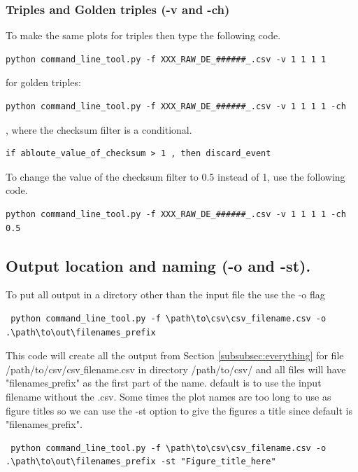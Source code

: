 \documentclass[12pt]{article}
\begin{document}
\subsubsection{Triples and Golden triples (-v and -ch)} 

To make the same plots for triples then type the following code.

\begin{verbatim}
python command_line_tool.py -f XXX_RAW_DE_######_.csv -v 1 1 1 1

\end{verbatim}

for golden triples:

\begin{verbatim}
python command_line_tool.py -f XXX_RAW_DE_######_.csv -v 1 1 1 1 -ch

\end{verbatim}

, where the checksum filter is a conditional.
\begin{verbatim}
if abloute_value_of_checksum > 1 , then discard_event

\end{verbatim}

To change the value of the checksum filter to 0.5 instead of 1, use the following code.
\begin{verbatim}
python command_line_tool.py -f XXX_RAW_DE_######_.csv -v 1 1 1 1 -ch 0.5

\end{verbatim}

\subsection{Output location and naming (-o and -st).}
\label{subsubsec:qs_out}
 To put all output in a dirctory other than the input file the use the -o flag 
 \begin{verbatim}
 python command_line_tool.py -f \path\to\csv\csv_filename.csv -o .\path\to\out\filenames_prefix
 \end{verbatim}
 
 This code will create all the output from Section \ref{subsubsec:everything} for file /path/to/csv/csv$\_$filename.csv in  directory /path/to/csv/ and all files will have "filenames$\_$prefix" as the first part of the name. default is to use the input filename without the .csv. Some times the plot names are too long to use as figure titles so we can use the -st option to give the figures a title since default is "filenames$\_$prefix". 
 \begin{verbatim}
 python command_line_tool.py -f \path\to\csv\csv_filename.csv -o .\path\to\out\filenames_prefix -st "Figure_title_here"
 \end{verbatim}
 
\end{document}
